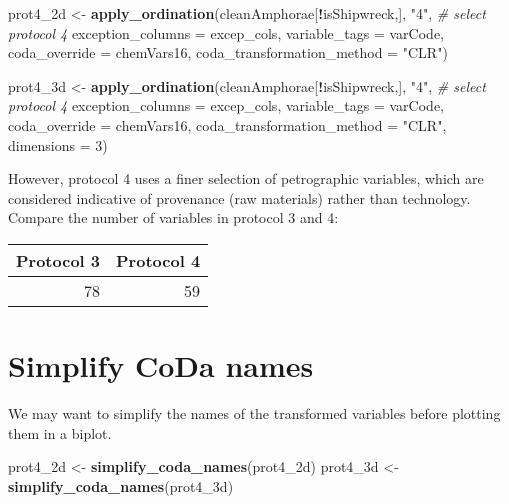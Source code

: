 \documentclass[12pt,]{book}
\newenvironment{Shaded}{\begin{snugshade}}{\end{snugshade}}
\newcommand{\CommentTok}[1]{\textcolor[rgb]{0.56,0.35,0.01}{\textit{#1}}}
\newcommand{\DataTypeTok}[1]{\textcolor[rgb]{0.13,0.29,0.53}{#1}}
\newcommand{\DecValTok}[1]{\textcolor[rgb]{0.00,0.00,0.81}{#1}}
\newcommand{\KeywordTok}[1]{\textcolor[rgb]{0.13,0.29,0.53}{\textbf{#1}}}
\newcommand{\NormalTok}[1]{#1}
\newcommand{\OperatorTok}[1]{\textcolor[rgb]{0.81,0.36,0.00}{\textbf{#1}}}
\newcommand{\StringTok}[1]{\textcolor[rgb]{0.31,0.60,0.02}{#1}}
\begin{document}
\begin{Shaded}
\begin{Highlighting}[]
\NormalTok{prot4_2d <-}\StringTok{ }\KeywordTok{apply_ordination}\NormalTok{(cleanAmphorae[}\OperatorTok{!}\NormalTok{isShipwreck,],}
                             \StringTok{"4"}\NormalTok{, }\CommentTok{# select protocol 4}
                             \DataTypeTok{exception_columns =}\NormalTok{ excep_cols,}
                             \DataTypeTok{variable_tags =}\NormalTok{ varCode,}
                             \DataTypeTok{coda_override =}\NormalTok{ chemVars16,}
                             \DataTypeTok{coda_transformation_method =} \StringTok{"CLR"}\NormalTok{)}

\NormalTok{prot4_3d <-}\StringTok{ }\KeywordTok{apply_ordination}\NormalTok{(cleanAmphorae[}\OperatorTok{!}\NormalTok{isShipwreck,],}
                             \StringTok{"4"}\NormalTok{, }\CommentTok{# select protocol 4}
                             \DataTypeTok{exception_columns =}\NormalTok{ excep_cols,}
                             \DataTypeTok{variable_tags =}\NormalTok{ varCode,}
                             \DataTypeTok{coda_override =}\NormalTok{ chemVars16,}
                             \DataTypeTok{coda_transformation_method =} \StringTok{"CLR"}\NormalTok{,}
                             \DataTypeTok{dimensions =} \DecValTok{3}\NormalTok{)}
\end{Highlighting}
\end{Shaded}

However, protocol 4 uses a finer selection of petrographic variables, which are considered indicative of provenance (raw materials) rather than technology. Compare the number of variables in protocol 3 and 4:

\begin{tabular}{r|r}
\hline
Protocol 3 & Protocol 4\\
\hline
78 & 59\\
\hline
\end{tabular}

\hypertarget{simplify-coda-names-2}{%
\section{Simplify CoDa names}\label{simplify-coda-names-2}}

We may want to simplify the names of the transformed variables before plotting them in a biplot.

\begin{Shaded}
\begin{Highlighting}[]
\NormalTok{prot4_2d <-}\StringTok{ }\KeywordTok{simplify_coda_names}\NormalTok{(prot4_2d)}
\NormalTok{prot4_3d <-}\StringTok{ }\KeywordTok{simplify_coda_names}\NormalTok{(prot4_3d)}
\end{Highlighting}
\end{Shaded}
\end{document}
